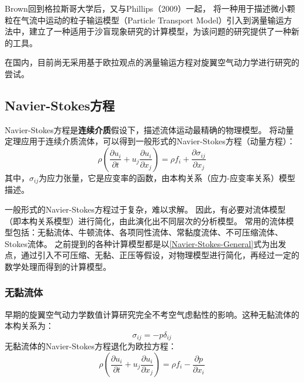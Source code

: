 Brown回到格拉斯哥大学后，又与Phillips（2009）一起，
将一种用于描述微小颗粒在气流中运动的粒子输运模型（Particle Transport Model）引入到涡量输运方法中，建立了一种适用于沙盲现象研究的计算模型，为该问题的研究提供了一种新的工具。

在国内，目前尚无采用基于欧拉观点的涡量输运方程对旋翼空气动力学进行研究的尝试。


\subsection{Navier-Stokes方程}\label{Navier-Stokes-Equation}
Navier-Stokes方程是\textbf{连续介质}假设下，描述流体运动最精确的物理模型。
将动量定理应用于连续介质流体，可以得到一般形式的Navier-Stokes方程（动量方程）：
\begin{equation}\label{Navier-Stokes-General}
\rho\left( \frac{\partial u_i }{\partial t} + u_j \frac{\partial u_i}{\partial x_j}  \right)
=
\rho f_i + \frac{\partial \sigma_{ij}}{\partial x_j}
\end{equation}
其中，$\sigma_{ij}$为应力张量，它是应变率的函数，由本构关系（应力-应变率关系）模型描述。

一般形式的Navier-Stokes方程过于复杂，难以求解。
因此，有必要对流体模型（即本构关系模型）进行简化，由此演化出不同层次的分析模型。
常用的流体模型包括：无黏流体、牛顿流体、各项同性流体、常黏度流体、不可压缩流体、Stokes流体。
之前提到的各种计算模型都是以\ref{Navier-Stokes-General}式为出发点，通过引入不可压缩、无黏、正压等假设，对物理模型进行简化，再经过一定的数学处理而得到的计算模型。

\subsubsection{无黏流体}
早期的旋翼空气动力学数值计算研究完全不考空气虑黏性的影响。这种无黏流体的本构关系为：
\begin{equation}
\sigma_{ij}
=
-p\delta_{ij}
\end{equation}
无黏流体的Navier-Stokes方程退化为欧拉方程：
\begin{equation}
\rho\left( \frac{\partial u_i }{\partial t} + u_j \frac{\partial u_i}{\partial x_j}  \right)
=
\rho f_i - \frac{\partial p }{\partial x_i}
\end{equation}

